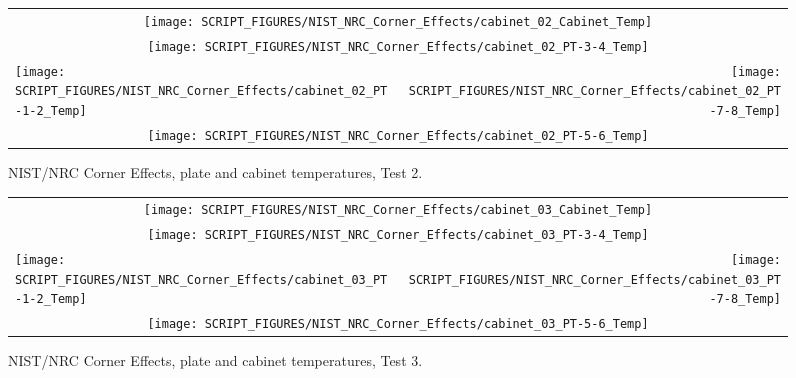 \begin{figure}[p]
\begin{tabular*}{\textwidth}{l@{\extracolsep{\fill}}r}
\multicolumn{2}{c}{\texttt{[image: SCRIPT\_FIGURES/NIST\_NRC\_Corner\_Effects/cabinet\_02\_Cabinet\_Temp]}} \\
\multicolumn{2}{c}{\texttt{[image: SCRIPT\_FIGURES/NIST\_NRC\_Corner\_Effects/cabinet\_02\_PT-3-4\_Temp]}} \\
\texttt{[image: SCRIPT\_FIGURES/NIST\_NRC\_Corner\_Effects/cabinet\_02\_PT-1-2\_Temp]} &
\texttt{[image: SCRIPT\_FIGURES/NIST\_NRC\_Corner\_Effects/cabinet\_02\_PT-7-8\_Temp]} \\
\multicolumn{2}{c}{\texttt{[image: SCRIPT\_FIGURES/NIST\_NRC\_Corner\_Effects/cabinet\_02\_PT-5-6\_Temp]}}
\end{tabular*}
\caption[NIST/NRC Corner Effects, plate and cabinet temperatures, Test 2]{NIST/NRC Corner Effects, plate and cabinet temperatures, Test 2.}
\label{NIST_NRC_Cabinet_PT_Test_2}
\end{figure}

\begin{figure}[p]
\begin{tabular*}{\textwidth}{l@{\extracolsep{\fill}}r}
\multicolumn{2}{c}{\texttt{[image: SCRIPT\_FIGURES/NIST\_NRC\_Corner\_Effects/cabinet\_03\_Cabinet\_Temp]}} \\
\multicolumn{2}{c}{\texttt{[image: SCRIPT\_FIGURES/NIST\_NRC\_Corner\_Effects/cabinet\_03\_PT-3-4\_Temp]}} \\
\texttt{[image: SCRIPT\_FIGURES/NIST\_NRC\_Corner\_Effects/cabinet\_03\_PT-1-2\_Temp]} &
\texttt{[image: SCRIPT\_FIGURES/NIST\_NRC\_Corner\_Effects/cabinet\_03\_PT-7-8\_Temp]} \\
\multicolumn{2}{c}{\texttt{[image: SCRIPT\_FIGURES/NIST\_NRC\_Corner\_Effects/cabinet\_03\_PT-5-6\_Temp]}}
\end{tabular*}
\caption[NIST/NRC Corner Effects, plate and cabinet temperatures, Test 3]{NIST/NRC Corner Effects, plate and cabinet temperatures, Test 3.}
\label{NIST_NRC_Cabinet_PT_Test_3}
\end{figure}

